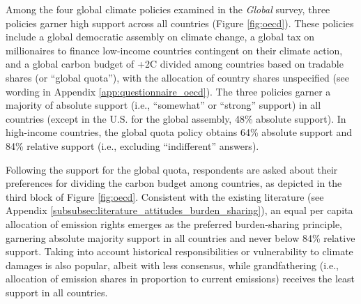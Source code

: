 Among the four global climate policies examined in the \textit{Global} survey, three policies garner high support across all countries (Figure \ref{fig:oecd}). These policies include a global democratic assembly on climate change, a global tax on millionaires to finance low-income countries contingent on their climate action, and a global carbon budget of +2\textdegree{}C divided among countries based on tradable shares (or ``global quota''), with the allocation of country shares unspecified (see wording in Appendix \ref{app:questionnaire_oecd}). 
The three policies garner a majority of absolute support (i.e., ``somewhat'' or ``strong'' support) in all countries (except in the U.S. for the global assembly, 48\% absolute support). In high-income countries, the global quota policy obtains 64\% absolute support and 84\% relative support (i.e., excluding ``indifferent'' answers). %

Following the support for the global quota, respondents are asked about their preferences for dividing the carbon budget among countries, as depicted in the third block of Figure \ref{fig:oecd}. Consistent with the existing literature (see Appendix \ref{subsubsec:literature_attitudes_burden_sharing}), an equal per capita allocation of emission rights emerges as the preferred burden-sharing principle, garnering absolute majority support in all countries and never below 84\% relative support. Taking into account historical responsibilities or vulnerability to climate damages is also popular, albeit with less consensus, while grandfathering (i.e., allocation of emission shares in proportion to current emissions) receives the least support in all countries.

